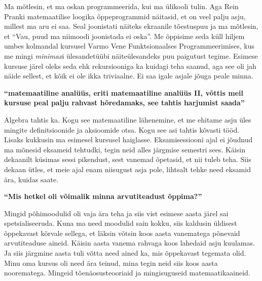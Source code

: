 Ma mõtlesin, et ma oskan programmeerida, kui ma ülikooli tulin. Aga Rein
Pranki matemaatilise loogika õppeprogrammid näitasid,
et on veel palju asju, millest ma aru ei saa. Seal joonistati näiteks ekraanile
tõestuspuu ja ma mõtlesin, et \enquote{Vau, puud ma niimoodi joonistada ei
oska}. Me õppisime seda küll hiljem umbes kolmandal kursusel Varmo
Vene Funktsionaalses Programmeerimises, kus me mingi
\emph{minimax}i ülesandetüübi näiteülesandeks puu paigutust tegime. Esimese
kursuse järel oleks seda ehk rekursiooniga ka kuidagi teha saanud, aga see oli
jah näide sellest, et kõik ei ole ikka triviaalne. Ei saa igale asjale jõuga
peale minna.

\textbf{\enquote{matemaatiline analüüs, eriti matemaatiline analüüs II, võttis
meil kursuse peal palju rahvast hõredamaks, see tahtis harjumist saada}}

Algebra tahtis ka. Kogu see matemaatiline lähenemine, et me ehitame asju üles
mingite definitsioonide ja aksioomide otsa. Kogu see asi tahtis kõvasti tööd.
Lisaks kukkusin ma esimesel kursusel haiglasse. Eksamisessiooni ajal ei jõudnud
ma mõnesid eksameid tehtudki, tegin neid alles järgmise semestri sees. Käisin
dekaanilt küsimas sessi pikendust, sest vanemad õpetasid, et nii tuleb teha.
Siis dekaan ütles, et meie ajal enam niisugust asja pole, lihtsalt tehke need
eksamid ära, kuidas saate.

\textbf{\enquote{Mis hetkel oli võimalik minna arvutiteadust õppima?}}

Mingid põhimoodulid oli vaja ära teha ja siis vist esimese aasta järel sai
spetsialiseeruda. Kuna ma need moodulid sain kokku, siis kaldusin üldisest
õppekavast kõrvale sellega, et läksin võtsin koos aasta vanematega põnevaid
arvutiteaduse aineid. Käisin aasta vanema rahvaga koos lahedaid asju kuulamas.
Ja siis järgmine aasta tuli võtta need ained ka, mis õppekavast tegemata olid.
Minu oma kursus oli need ära teinud, mina tegin neid siis koos aasta
noorematega. Mingeid tõenäosusteooriaid ja mingisuguseid matemaatikaaineid.

